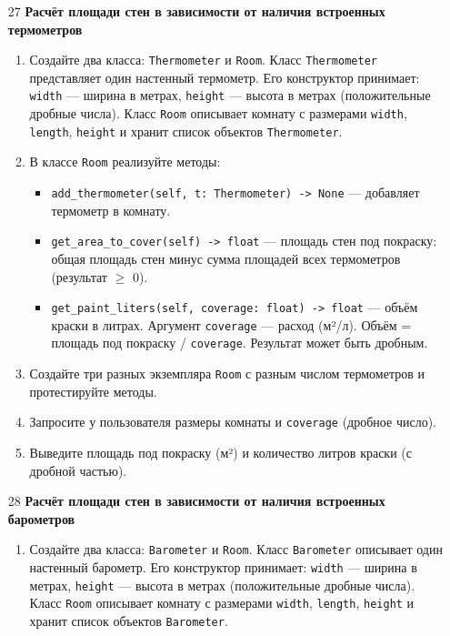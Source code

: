\begin{enumerate}
\item[27] \textbf{Расчёт площади стен в зависимости от наличия встроенных термометров}
\begin{enumerate}
    \item Создайте два класса: \texttt{Thermometer} и \texttt{Room}.  
    Класс \texttt{Thermometer} представляет один настенный термометр. Его конструктор принимает:  
    \texttt{width} — ширина в метрах,  
    \texttt{height} — высота в метрах (положительные дробные числа).  
    Класс \texttt{Room} описывает комнату с размерами \texttt{width}, \texttt{length}, \texttt{height} и хранит список объектов \texttt{Thermometer}.

    \item В классе \texttt{Room} реализуйте методы:  
    \begin{itemize}
        \item \texttt{add\_thermometer(self, t: Thermometer) -> None} — добавляет термометр в комнату.
        \item \texttt{get\_area\_to\_cover(self) -> float} — площадь стен под покраску: общая площадь стен минус сумма площадей всех термометров (результат $\geqslant$ 0).
        \item \texttt{get\_paint\_liters(self, coverage: float) -> float} — объём краски в литрах. Аргумент \texttt{coverage} — расход (м²/л). Объём = площадь под покраску / \texttt{coverage}. Результат может быть дробным.
    \end{itemize}

    \item Создайте три разных экземпляра \texttt{Room} с разным числом термометров и протестируйте методы.

    \item Запросите у пользователя размеры комнаты и \texttt{coverage} (дробное число).

    \item Выведите площадь под покраску (м²) и количество литров краски (с дробной частью).
\end{enumerate}

\item[28] \textbf{Расчёт площади стен в зависимости от наличия встроенных барометров}
\begin{enumerate}
    \item Создайте два класса: \texttt{Barometer} и \texttt{Room}.  
    Класс \texttt{Barometer} описывает один настенный барометр. Его конструктор принимает:  
    \texttt{width} — ширина в метрах,  
    \texttt{height} — высота в метрах (положительные дробные числа).  
    Класс \texttt{Room} описывает комнату с размерами \texttt{width}, \texttt{length}, \texttt{height} и хранит список объектов \texttt{Barometer}.


\end{enumerate}
\end{enumerate}

